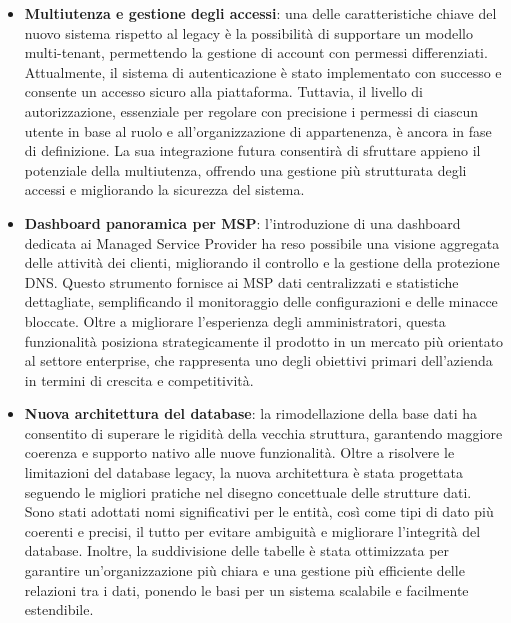 \begin{itemize}
  \item \textbf{Multiutenza e gestione degli accessi}: una delle caratteristiche chiave del nuovo sistema rispetto al legacy è la possibilità di supportare un modello multi-tenant, permettendo la gestione di account con permessi differenziati. Attualmente, il sistema di autenticazione è stato implementato con successo e consente un accesso sicuro alla piattaforma. Tuttavia, il livello di autorizzazione, essenziale per regolare con precisione i permessi di ciascun utente in base al ruolo e all’organizzazione di appartenenza, è ancora in fase di definizione. La sua integrazione futura consentirà di sfruttare appieno il potenziale della multiutenza, offrendo una gestione più strutturata degli accessi e migliorando la sicurezza del sistema.

  \item \textbf{Dashboard panoramica per MSP}: l’introduzione di una dashboard dedicata ai Managed Service Provider ha reso possibile una visione aggregata delle attività dei clienti, migliorando il controllo e la gestione della protezione DNS. Questo strumento fornisce ai MSP dati centralizzati e statistiche dettagliate, semplificando il monitoraggio delle configurazioni e delle minacce bloccate. Oltre a migliorare l’esperienza degli amministratori, questa funzionalità posiziona strategicamente il prodotto in un mercato più orientato al settore enterprise, che rappresenta uno degli obiettivi primari dell’azienda in termini di crescita e competitività.

  \item \textbf{Nuova architettura del database}: la rimodellazione della base dati ha consentito di superare le rigidità della vecchia struttura, garantendo maggiore coerenza e supporto nativo alle nuove funzionalità. Oltre a risolvere le limitazioni del database legacy, la nuova architettura è stata progettata seguendo le migliori pratiche nel disegno concettuale delle strutture dati. Sono stati adottati nomi significativi per le entità, così come tipi di dato più coerenti e precisi, il tutto per evitare ambiguità e migliorare l'integrità del database. Inoltre, la suddivisione delle tabelle è stata ottimizzata per garantire un'organizzazione più chiara e una gestione più efficiente delle relazioni tra i dati, ponendo le basi per un sistema scalabile e facilmente estendibile.


\end{itemize}
